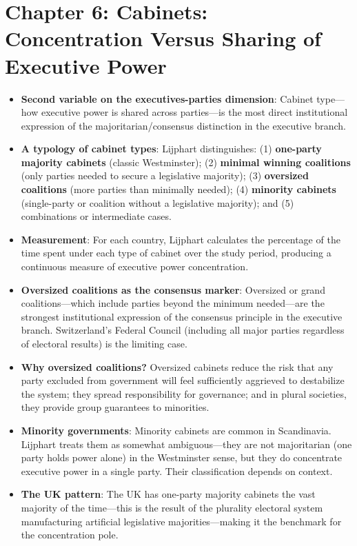 \documentclass[12pt]{article}
\begin{document}
\section{Chapter 6: Cabinets: Concentration Versus Sharing of Executive Power}

\begin{itemize}[leftmargin=*, itemsep=4pt]
    \item \textbf{Second variable on the executives-parties dimension}: Cabinet type---how executive power is shared across parties---is the most direct institutional expression of the majoritarian/consensus distinction in the executive branch.
    \item \textbf{A typology of cabinet types}: Lijphart distinguishes: (1) \textbf{one-party majority cabinets} (classic Westminster); (2) \textbf{minimal winning coalitions} (only parties needed to secure a legislative majority); (3) \textbf{oversized coalitions} (more parties than minimally needed); (4) \textbf{minority cabinets} (single-party or coalition without a legislative majority); and (5) combinations or intermediate cases.
    \item \textbf{Measurement}: For each country, Lijphart calculates the percentage of the time spent under each type of cabinet over the study period, producing a continuous measure of executive power concentration.
    \item \textbf{Oversized coalitions as the consensus marker}: Oversized or grand coalitions---which include parties beyond the minimum needed---are the strongest institutional expression of the consensus principle in the executive branch. Switzerland's Federal Council (including all major parties regardless of electoral results) is the limiting case.
    \item \textbf{Why oversized coalitions?} Oversized cabinets reduce the risk that any party excluded from government will feel sufficiently aggrieved to destabilize the system; they spread responsibility for governance; and in plural societies, they provide group guarantees to minorities.
    \item \textbf{Minority governments}: Minority cabinets are common in Scandinavia. Lijphart treats them as somewhat ambiguous---they are not majoritarian (one party holds power alone) in the Westminster sense, but they do concentrate executive power in a single party. Their classification depends on context.
    \item \textbf{The UK pattern}: The UK has one-party majority cabinets the vast majority of the time---this is the result of the plurality electoral system manufacturing artificial legislative majorities---making it the benchmark for the concentration pole.
\end{itemize}
\end{document}
